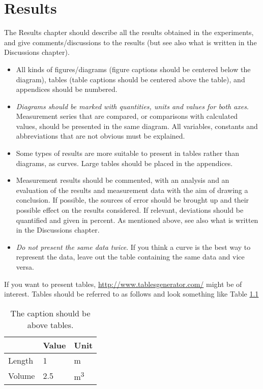 \chapter{Results}\label{ch:Results}

The Results chapter should describe all the results obtained in the experiments, and give comments/discussions to the results (but see also what is written in the Discussions chapter). 
\begin{itemize}
\item All kinds of figures/diagrams (figure captions should be centered below the diagram), tables (table captions should be centered above the table), and appendices should be numbered. 
\item {\em Diagrams should be marked with quantities, units and values for both axes}. Measurement series that are compared, or comparisons with calculated values, should be presented in the same diagram. All variables, constants and abbreviations that are not obvious must be explained. 
\item Some types of results are more suitable to present in tables rather than diagrams, as curves.
Large tables should be placed in the appendices. 
\item Measurement results should be commented, with an analysis and an evaluation of the results and measurement data with the aim of drawing a conclusion. If possible, the sources of error should be brought up and their possible effect on the results considered. If relevant, deviations should be quantified and given in percent. As mentioned above, see also what is written in the Discussions chapter.
\item {\em Do not present the same data twice}. If you think a curve is the best way to represent the data, leave out the table containing the same data and vice versa.
\end{itemize}

If you want to present tables, \url{http://www.tablesgenerator.com/} might be of interest. Tables should be referred to as follows and look something like Table \ref{tab:Table}
 
\begin{table}[h] %
    \centering
    \caption{The caption should be above tables.}    
    \begin{tabular}{lll}
       & Value & Unit                 \\ \hline
    Length & 1     & m                    \\
    Volume & 2.5   & m\textsuperscript{3}
    \label{tab:Table}
    \end{tabular}
\end{table}


